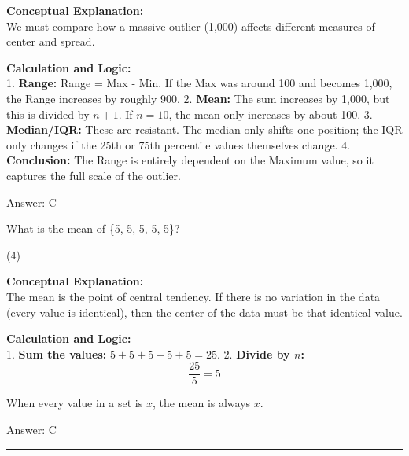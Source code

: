 \documentclass[11pt,paper=a4,answers]{exam}
\begin{document}
\begin{questions}
\begin{solution}
\textbf{Conceptual Explanation:} \\
We must compare how a massive outlier (1,000) affects different measures of center and spread.

\vspace{30pt}

\textbf{Calculation and Logic:} \\
1. \textbf{Range:} Range = Max - Min. If the Max was around 100 and becomes 1,000, the Range increases by roughly 900.
2. \textbf{Mean:} The sum increases by 1,000, but this is divided by $n+1$. If $n=10$, the mean only increases by about 100.
3. \textbf{Median/IQR:} These are resistant. The median only shifts one position; the IQR only changes if the 25th or 75th percentile values themselves change.
4. \textbf{Conclusion:} The Range is entirely dependent on the Maximum value, so it captures the full scale of the outlier.

\vspace{30pt}

Answer: \colorbox{yellow!100}{C}
\end{solution}

\vspace{60pt}

\question
What is the mean of \{5, 5, 5, 5, 5\}?
\begin{tasks}(4)
\end{tasks}

\begin{solution}
\textbf{Conceptual Explanation:} \\
The mean is the point of central tendency. If there is no variation in the data (every value is identical), then the center of the data must be that identical value.

\vspace{30pt}

\textbf{Calculation and Logic:} \\
1. \textbf{Sum the values:} $5 + 5 + 5 + 5 + 5 = 25$.
2. \textbf{Divide by $n$:} 
\[ \frac{25}{5} = 5 \]

\vspace{20pt}

When every value in a set is $x$, the mean is always $x$.

\vspace{30pt}

Answer: \colorbox{yellow!100}{C}
\end{solution}

\end{questions}
\begin{center}
\rule{.5\textwidth}{1pt}
\end{center}
\end{document}
